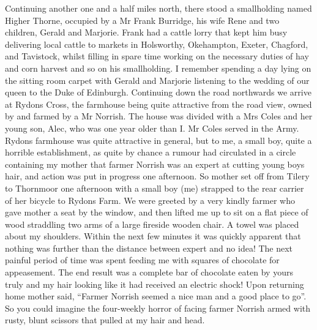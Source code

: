 Continuing another one and a half miles north, there stood a smallholding named
Higher Thorne, occupied by a Mr Frank Burridge, his wife Rene and two children,
Gerald and Marjorie. Frank had a cattle lorry that kept him busy delivering
local cattle to markets in Holsworthy, Okehampton, Exeter, Chagford, and
Tavistock, whilst filling in spare time working on the necessary duties of hay
and corn harvest and so on his smallholding. I remember spending a day lying on
the sitting room carpet with Gerald and Marjorie listening to the wedding of
our queen to the Duke of Edinburgh. Continuing down the road northwards we
arrive at Rydons Cross, the farmhouse being quite attractive from the road
view, owned by and farmed by a Mr Norrish. The house was divided with a Mrs
Coles and her young son, Alec, who was one year older than I. Mr Coles served
in the Army. Rydons farmhouse was quite attractive in general, but to me, a
small boy, quite a horrible establishment, as quite by chance a rumour had
circulated in a circle containing my mother that farmer Norrish was an expert
at cutting young boys hair, and action was put in progress one afternoon. So
mother set off from Tilery to Thornmoor one afternoon with a small boy
(me) strapped to the rear carrier of her bicycle to Rydons Farm. We were
greeted by a very kindly farmer who gave mother a seat by the window, and then
lifted me up to sit on a flat piece of wood straddling two arms of a large
fireside wooden chair. A towel was placed about my shoulders. Within the next
few minutes it was quickly apparent that nothing was further than the distance
between expert and no idea! The next painful period of time was spent feeding
me with squares of chocolate for appeasement. The end result was a complete bar
of chocolate eaten by yours truly and my hair looking like it had received an
electric shock! Upon returning home mother said, ``Farmer Norrish seemed a
nice man and a good place to go''. So you could imagine the four-weekly horror
of facing farmer Norrish armed with rusty, blunt scissors that pulled at my
hair and head.

